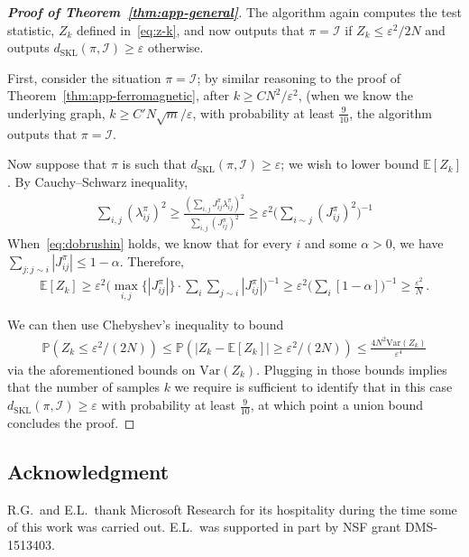 \documentclass[reqno,11pt]{amsart}
\numberwithin{equation}{section}
\renewcommand{\epsilon}{\varepsilon}
\theoremstyle{definition}{
\newtheorem{example}[theorem]{Example}
\newtheorem{definition}[theorem]{Definition}
\newtheorem*{definition*}{Definition}
\newtheorem{problem}[theorem]{Problem}
\newtheorem{question}[theorem]{Question}
\newtheorem{remark}[theorem]{Remark}
}
\renewcommand{\epsilon}{\varepsilon}
\begin{document}
\begin{proof}[\textbf{\emph{Proof of Theorem~\ref{thm:app-general}}}]
The algorithm again computes the test statistic, $Z_k$ defined in~\eqref{eq:z-k}, and now outputs that $\pi = \mathcal I$ if $Z_k \leq \epsilon^2/2N$ and outputs $d_{\mathrm{SKL}} (\pi, \mathcal I)\geq \epsilon$ otherwise.  

First, consider the situation $\pi = \mathcal I$; by similar reasoning to the proof of Theorem~\ref{thm:app-ferromagnetic}, after $k \geq CN^2/ \epsilon^2$, (when we know the underlying graph, $k \geq C'N\sqrt{m}/\epsilon$, with probability at least $\frac9{10}$, the algorithm outputs that $\pi = \mathcal I$. 

Now suppose that $\pi$ is such that $d_{\mathrm{SKL}}(\pi, \mathcal I) \geq \epsilon$; we wish to lower bound $\mathbb E[Z_k]$. By Cauchy--Schwarz inequality, 
\begin{align*}
\sum_{i,j}  (\lambda_{ij}^{\pi})^2 \geq \frac{(\sum_{i,j} J_{ij}^\pi \lambda_{ij}^{\pi})^2}{\sum_{i,j} (J_{ij}^\pi)^2} \geq  {\epsilon^2} \bigg(\sum_{i\sim j} (J_{ij}^{\pi})^{2}\bigg)^{-1}
\end{align*}
When~\eqref{eq:dobrushin} holds, we know that for every $i$ and some $\alpha>0$, we have $\sum_{j:j\sim i} |J_{ij}^\pi| \leq 1-\alpha$. Therefore, 
\begin{align*}
\mathbb E[Z_k] \geq \epsilon^2 \bigg( \max_{i,j} \{|J_{ij}^\pi|\} \cdot \sum_i \sum_{j\sim i} |J_{ij}^\pi|\bigg)^{-1} \geq \epsilon^2 \bigg(\sum_i [1-\alpha] \bigg)^{-1} \geq \frac{\epsilon^2}N \,.
\end{align*}

We can then use Chebyshev's inequality to bound 
\begin{align*}
\mathbb P(Z_k \leq \epsilon^2/(2N)) \leq \mathbb P(|Z_k- \mathbb E[Z_k]| \geq \epsilon^2/(2N)) \leq \frac{4N^2\mathrm{Var}(Z_k)}{\epsilon^4}
\end{align*} via the aforementioned bounds on $\mbox{Var}(Z_k)$. Plugging in those bounds implies that the number of samples $k$ we require is sufficient to identify that in this case $d_{\mathrm{SKL}}(\pi,\mathcal I)\geq \epsilon$ with probability at least $\frac9{10}$, at which point a union bound concludes the proof.
\end{proof}

\subsection*{Acknowledgment} R.G.\ and E.L.\ thank Microsoft Research for its hospitality during the time some of this work was carried out.
 E.L.\ was supported in part by NSF grant DMS-1513403.




\end{document}
